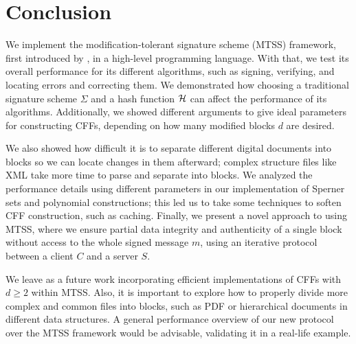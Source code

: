 \documentclass[12pt]{article}
\begin{document}
\section{Conclusion}
\label{sec:conclusion}

We implement the modification-tolerant signature scheme (MTSS) framework, first introduced by \cite{mtss-idalino-2019}, in a high-level programming language. With that, we test its overall performance for its different algorithms, such as signing, verifying, and locating errors and correcting them. We demonstrated how choosing a traditional signature scheme $\Sigma$ and a hash function $\mathcal{H}$ can affect the performance of its algorithms. Additionally, we showed different arguments to give ideal parameters for constructing CFFs, depending on how many modified blocks $d$ are desired.

We also showed how difficult it is to separate different digital documents into blocks so we can locate changes in them afterward; complex structure files like XML take more time to parse and separate into blocks. We analyzed the performance details using different parameters in our implementation of Sperner sets and polynomial constructions; this led us to take some techniques to soften CFF construction, such as caching. Finally, we present a novel approach to using MTSS, where we ensure partial data integrity and authenticity of a single block without access to the whole signed message $m$, using an iterative protocol between a client $C$ and a server $S$.

We leave as a future work incorporating efficient implementations of CFFs with $d \geq 2$ within MTSS. Also, it is important to explore how to properly divide more complex and common files into blocks, such as PDF or hierarchical documents in different data structures. A general performance overview of our new protocol over the MTSS framework would be advisable, validating it in a real-life example.



\end{document}
